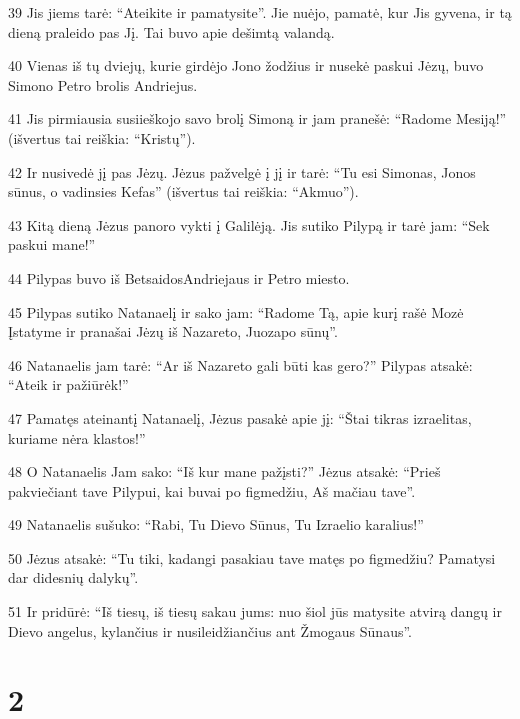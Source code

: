 \par 39 Jis jiems tarė: “Ateikite ir pamatysite”. Jie nuėjo, pamatė, kur Jis gyvena, ir tą dieną praleido pas Jį. Tai buvo apie dešimtą valandą. 
\par 40 Vienas iš tų dviejų, kurie girdėjo Jono žodžius ir nusekė paskui Jėzų, buvo Simono Petro brolis Andriejus. 
\par 41 Jis pirmiausia susiieškojo savo brolį Simoną ir jam pranešė: “Radome Mesiją!” (išvertus tai reiškia: “Kristų”). 
\par 42 Ir nusivedė jį pas Jėzų. Jėzus pažvelgė į jį ir tarė: “Tu esi Simonas, Jonos sūnus, o vadinsies Kefas” (išvertus tai reiškia: “Akmuo”). 
\par 43 Kitą dieną Jėzus panoro vykti į Galilėją. Jis sutiko Pilypą ir tarė jam: “Sek paskui mane!” 
\par 44 Pilypas buvo iš Betsaidos­Andriejaus ir Petro miesto. 
\par 45 Pilypas sutiko Natanaelį ir sako jam: “Radome Tą, apie kurį rašė Mozė Įstatyme ir pranašai­ Jėzų iš Nazareto, Juozapo sūnų”. 
\par 46 Natanaelis jam tarė: “Ar iš Nazareto gali būti kas gero?” Pilypas atsakė: “Ateik ir pažiūrėk!” 
\par 47 Pamatęs ateinantį Natanaelį, Jėzus pasakė apie jį: “Štai tikras izraelitas, kuriame nėra klastos!” 
\par 48 O Natanaelis Jam sako: “Iš kur mane pažįsti?” Jėzus atsakė: “Prieš pakviečiant tave Pilypui, kai buvai po figmedžiu, Aš mačiau tave”. 
\par 49 Natanaelis sušuko: “Rabi, Tu Dievo Sūnus, Tu Izraelio karalius!” 
\par 50 Jėzus atsakė: “Tu tiki, kadangi pasakiau tave matęs po figmedžiu? Pamatysi dar didesnių dalykų”. 
\par 51 Ir pridūrė: “Iš tiesų, iš tiesų sakau jums: nuo šiol jūs matysite atvirą dangų ir Dievo angelus, kylančius ir nusileidžiančius ant Žmogaus Sūnaus”.


\chapter{2}


